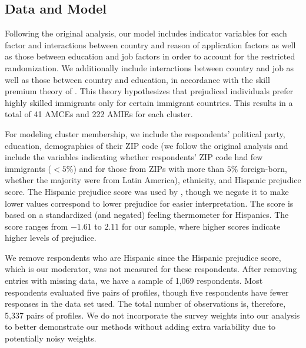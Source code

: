 \documentclass[11pt]{article}
\begin{document}
\subsection{Data and Model}\label{sec:analysis:data_model}

Following the original analysis, our model includes indicator variables
for each factor and interactions between country and reason of
application factors as well as those between education and job factors
in order to account for the restricted randomization.  We additionally
include interactions between country and job as well as those between
country and education, in accordance with the skill premium theory of
\cite{newman2019economic}.  This theory hypothesizes that prejudiced
individuals prefer highly skilled immigrants only for certain
immigrant countries.  This results in a total of 41 AMCEs and 222
AMIEs for each cluster.

For modeling cluster membership, we include the respondents' political
party, education, demographics of their ZIP code (we follow the
original analysis and include the variables indicating whether
respondents' ZIP code had few immigrants ($<5\%$) and for those from
ZIPs with more than $5\%$ foreign-born, whether the majority were from
Latin America), ethnicity, and Hispanic prejudice score.  The Hispanic
prejudice score was used by \cite{newman2019economic}, though we
negate it to make lower values correspond to lower prejudice for
easier interpretation.  The score is based on a standardized (and
negated) feeling thermometer for Hispanics.  The score ranges from
$-1.61$ to $2.11$ for our sample, where higher scores indicate higher
levels of prejudice.


We remove respondents who are Hispanic since the Hispanic prejudice
score, which is our moderator, was not measured for these respondents.
After removing entries with missing data, we have a sample of 1,069
respondents. Most respondents evaluated five pairs of profiles, though
five respondents have fewer responses in the data set used.  The total
number of observations is, therefore, 5,337 pairs of profiles.  We do
not incorporate the survey weights into our analysis to better
demonstrate our methods without adding extra variability due to
potentially noisy weights.
\end{document}
